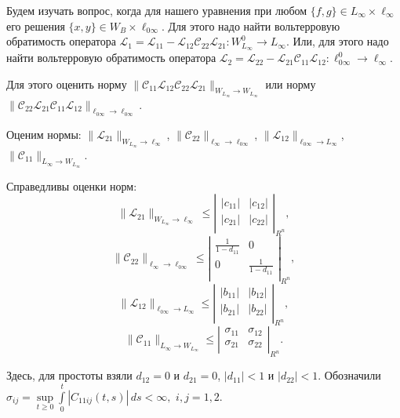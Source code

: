 Будем изучать вопрос, когда для нашего уравнения при любом $\{ f,g\} \in L_{\infty}\times \ell_{\infty}$ его решения $\{ x,y\} \in W_{B}\times \ell_{0\infty}$. Для этого надо найти вольтерровую обратимость оператора ${\mathcal L}_1= {\mathcal L}_{11} - {\mathcal L}_{12} {\mathcal C}_{22} {\mathcal L}_{21}: W_{L_{\infty}}^{0} \to L_{\infty}$. Или, для этого надо найти вольтерровую обратимость оператора ${\mathcal L}_2= {\mathcal L}_{22} - {\mathcal L}_{21} {\mathcal C}_{11} {\mathcal L}_{12}: \ell_{0\infty}^0 \to \ell_{\infty}$.

Для этого оценить норму $\|{\mathcal C}_{11}{\mathcal L}_{12} {\mathcal C}_{22} {\mathcal L}_{21}\|_{W_{L_{\infty}}\to W_{L_{\infty}}}$ или норму $\|{\mathcal C}_{22}{\mathcal L}_{21} {\mathcal C}_{11} {\mathcal L}_{12}\|_{{\ell_{0\infty}}\to {\ell_{0\infty}}}$.

Оценим нормы: $\|{\mathcal L}_{21}\|_{W_{L_{\infty}}\to \ell_{\infty}}$, $\|{\mathcal C}_{22}\|_{\ell_{\infty}\to \ell_{0\infty}}$, $\|{\mathcal L}_{12}\|_{\ell_{0\infty}\to L_{\infty}}$, $\|{\mathcal C}_{11}\|_{L_{\infty}\to W_{L_{\infty}}}$.

Справедливы оценки норм:
$$
\|{\mathcal L}_{21}\|_{W_{L_{\infty}}\to \ell_{\infty}} \leq
\left|\begin{array}{cc}
|c_{11}| & |c_{12}| \\
|c_{21}| & |c_{22}| \\
\end{array}\right|_{R^n},
$$
$$
\|{\mathcal C}_{22}\|_{\ell_{\infty}\to \ell_{0\infty}} \leq
\left|\begin{array}{cc}
\frac{1}{1-d_{11}} & 0 \\
0 & \frac{1}{1-d_{11}} \\
\end{array}\right|_{R^n},
$$
$$
\|{\mathcal L}_{12}\|_{\ell_{0\infty}\to L_{\infty}} \leq
\left|\begin{array}{cc}
|b_{11}| & |b_{12}| \\
|b_{21}| & |b_{22}| \\
\end{array}\right|_{R^n},
$$
$$
\|{\mathcal C}_{11}\|_{L_{\infty}\to W_{L_{\infty}}} \leq
\left|\begin{array}{cc}
\sigma_{11} & \sigma_{12} \\
\sigma_{21} & \sigma_{22} \\
\end{array}\right|_{R^n}.$$

Здесь, для простоты взяли $d_{12}=0$ и $d_{21}=0$, $|d_{11}| < 1$ и $|d_{22}| < 1$.
Обозначили $\sigma_{ij}= \sup\limits_{t \geq 0}\int\limits_{0}^{t}|C_{11ij}(t,s)|\,ds < \infty, $ $i,j=1,2$.

